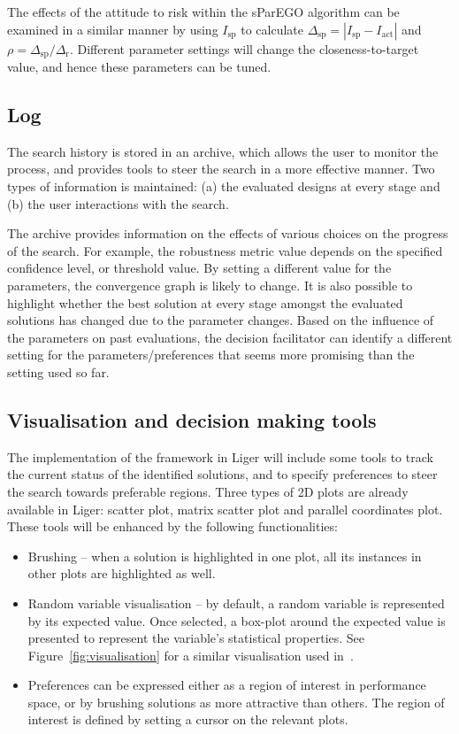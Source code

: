 \documentclass[a4paper]{article}
\newcommand{\brabs}[1]{\left\vert{#1}\right\vert} %
\begin{document}
The effects of the attitude to risk within the sParEGO algorithm can be examined in a similar manner by using $I_\text{sp}$ to calculate $\Delta_\text{sp} = \brabs{I_\text{sp}-I_\text{act}}$ and $\rho = \Delta_\text{sp} / \Delta_\text{r}$. Different parameter settings will change the closeness-to-target value, and hence these parameters can be tuned.

\subsection{Log}
\label{subsec:log}
The search history is stored in an archive, which allows the user to monitor the process, and provides tools to steer the search in a more effective manner. Two types of information is maintained: (a) the evaluated designs at every stage and (b) the user interactions with the search.

The archive provides information on the effects of various choices on the progress of the search. For example, the robustness metric value depends on the specified confidence level, or threshold value. By setting a different value for the parameters, the convergence graph is likely to change. It is also possible to highlight whether the best solution at every stage amongst the evaluated solutions has changed due to the parameter changes. Based on the influence of the parameters on past evaluations, the decision facilitator can identify a different setting for the parameters/preferences that seems more promising than the setting used so far.

\subsection{Visualisation and decision making tools}
\label{subsec:Visualisation}
The implementation of the framework in Liger will include some tools to track the current status of the identified solutions, and to specify preferences to steer the search towards preferable regions. Three types of 2D plots are already available in Liger: scatter plot, matrix scatter plot and parallel coordinates plot. These tools will be enhanced by the following functionalities:
\begin{itemize}
	\item Brushing -- when a solution is highlighted in one plot, all its instances in other plots are highlighted as well.
	\item Random variable visualisation --  by default, a random variable is represented by its expected value.
		Once selected, a box-plot around the expected value is presented to represent the variable's statistical properties.
		See Figure~\ref{fig:visualisation} for a similar visualisation used in~\cite{Berger2011uncertainty}.
	\item Preferences can be expressed either as a region of interest in performance space, or by brushing solutions as more attractive than others.
		The region of interest is defined by setting a cursor on the relevant plots.
\end{itemize}
\end{document}
